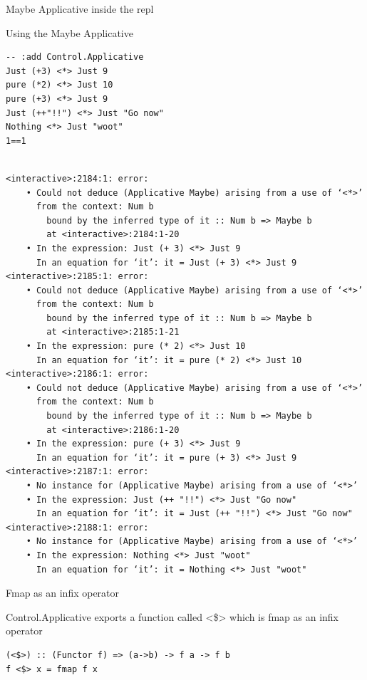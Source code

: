 \documentclass[presetation]{beamer}
\begin{document}
\begin{frame}[fragile,label={sec:org0c2e8f2}]{Maybe Applicative inside the repl}
 \begin{block}{Using the Maybe Applicative}
\begin{verbatim}
-- :add Control.Applicative
Just (+3) <*> Just 9
pure (*2) <*> Just 10
pure (+3) <*> Just 9
Just (++"!!") <*> Just "Go now"
Nothing <*> Just "woot"
1==1
\end{verbatim}

\begin{verbatim}

<interactive>:2184:1: error:
    • Could not deduce (Applicative Maybe) arising from a use of ‘<*>’
      from the context: Num b
        bound by the inferred type of it :: Num b => Maybe b
        at <interactive>:2184:1-20
    • In the expression: Just (+ 3) <*> Just 9
      In an equation for ‘it’: it = Just (+ 3) <*> Just 9
<interactive>:2185:1: error:
    • Could not deduce (Applicative Maybe) arising from a use of ‘<*>’
      from the context: Num b
        bound by the inferred type of it :: Num b => Maybe b
        at <interactive>:2185:1-21
    • In the expression: pure (* 2) <*> Just 10
      In an equation for ‘it’: it = pure (* 2) <*> Just 10
<interactive>:2186:1: error:
    • Could not deduce (Applicative Maybe) arising from a use of ‘<*>’
      from the context: Num b
        bound by the inferred type of it :: Num b => Maybe b
        at <interactive>:2186:1-20
    • In the expression: pure (+ 3) <*> Just 9
      In an equation for ‘it’: it = pure (+ 3) <*> Just 9
<interactive>:2187:1: error:
    • No instance for (Applicative Maybe) arising from a use of ‘<*>’
    • In the expression: Just (++ "!!") <*> Just "Go now"
      In an equation for ‘it’: it = Just (++ "!!") <*> Just "Go now"
<interactive>:2188:1: error:
    • No instance for (Applicative Maybe) arising from a use of ‘<*>’
    • In the expression: Nothing <*> Just "woot"
      In an equation for ‘it’: it = Nothing <*> Just "woot"
\end{verbatim}
\end{block}
\end{frame}


\begin{frame}[fragile,label={sec:org03e9f39}]{Fmap as an infix operator}
 \begin{block}{Control.Applicative exports a function called <\$>}
which is fmap as an infix operator
\begin{verbatim}
(<$>) :: (Functor f) => (a->b) -> f a -> f b
f <$> x = fmap f x
\end{verbatim}
\end{block}
\end{frame}
\end{document}
